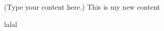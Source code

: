 \documentclass{article}
\begin{document}
(Type your content here.)
This is my new content

lalal
\end{document}
